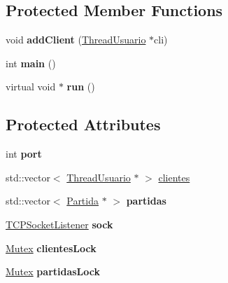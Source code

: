 \subsection*{Protected Member Functions}
\begin{DoxyCompactItemize}
\item 
\hypertarget{classServer_a481bc16ea121723ce0fbc0af843a3648}{void {\bfseries add\-Client} (\hyperlink{classThreadUsuario}{Thread\-Usuario} $\ast$cli)}\label{classServer_a481bc16ea121723ce0fbc0af843a3648}

\item 
\hypertarget{classServer_a707bd1cc6a43cb4a444fc5e2bec11533}{int {\bfseries main} ()}\label{classServer_a707bd1cc6a43cb4a444fc5e2bec11533}

\item 
\hypertarget{classServer_a6defda6a554b733c833987f85d2e509d}{virtual void $\ast$ {\bfseries run} ()}\label{classServer_a6defda6a554b733c833987f85d2e509d}

\end{DoxyCompactItemize}
\subsection*{Protected Attributes}
\begin{DoxyCompactItemize}
\item 
\hypertarget{classServer_a926c9dae229a62b6d33fdbb41dca6d82}{int {\bfseries port}}\label{classServer_a926c9dae229a62b6d33fdbb41dca6d82}

\item 
std\-::vector$<$ \hyperlink{classThreadUsuario}{Thread\-Usuario} $\ast$ $>$ \hyperlink{classServer_a295a2426aee46c5a82085fa5b70828c2}{clientes}
\item 
\hypertarget{classServer_a8f5063d67347091cd0d210fafe8d5cf1}{std\-::vector$<$ \hyperlink{classPartida}{Partida} $\ast$ $>$ {\bfseries partidas}}\label{classServer_a8f5063d67347091cd0d210fafe8d5cf1}

\item 
\hypertarget{classServer_aba30475b0b0ec7c39bc70c852c0d582e}{\hyperlink{classTCPSocketListener}{T\-C\-P\-Socket\-Listener} {\bfseries sock}}\label{classServer_aba30475b0b0ec7c39bc70c852c0d582e}

\item 
\hypertarget{classServer_ad33f68ad78c3045c49dcf066afb5c102}{\hyperlink{classMutex}{Mutex} {\bfseries clientes\-Lock}}\label{classServer_ad33f68ad78c3045c49dcf066afb5c102}

\item 
\hypertarget{classServer_a757a2d8318b9443d168bf4c772c76260}{\hyperlink{classMutex}{Mutex} {\bfseries partidas\-Lock}}\label{classServer_a757a2d8318b9443d168bf4c772c76260}

\end{DoxyCompactItemize}


